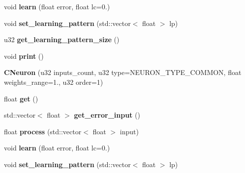 \begin{DoxyCompactItemize}
\item 
\hypertarget{classCNeuron_a64eb412ce09f2f59077281d86a085303}{void {\bfseries learn} (float error, float lc=0.)}\label{classCNeuron_a64eb412ce09f2f59077281d86a085303}

\item 
\hypertarget{classCNeuron_a0bcb7781406fa9a282eaafe4b154b5b6}{void {\bfseries set\-\_\-learning\-\_\-pattern} (std\-::vector$<$ float $>$ lp)}\label{classCNeuron_a0bcb7781406fa9a282eaafe4b154b5b6}

\item 
\hypertarget{classCNeuron_ad3cfde2fc3314e525345e8ec6595b1cb}{u32 {\bfseries get\-\_\-learning\-\_\-pattern\-\_\-size} ()}\label{classCNeuron_ad3cfde2fc3314e525345e8ec6595b1cb}

\item 
\hypertarget{classCNeuron_a37db8b58d3d3cd00c2cdc12b0a7466b3}{void {\bfseries print} ()}\label{classCNeuron_a37db8b58d3d3cd00c2cdc12b0a7466b3}

\item 
\hypertarget{classCNeuron_ae9f32d41d2bb7b9683a440e038f5b6f6}{{\bfseries C\-Neuron} (u32 inputs\-\_\-count, u32 type=N\-E\-U\-R\-O\-N\-\_\-\-T\-Y\-P\-E\-\_\-\-C\-O\-M\-M\-O\-N, float weights\-\_\-range=1., u32 order=1)}\label{classCNeuron_ae9f32d41d2bb7b9683a440e038f5b6f6}

\item 
\hypertarget{classCNeuron_af97048090878729c7d99dcb8363e61ff}{float {\bfseries get} ()}\label{classCNeuron_af97048090878729c7d99dcb8363e61ff}

\item 
\hypertarget{classCNeuron_a50f6d18278e8fa7cd4d189657b019989}{std\-::vector$<$ float $>$ {\bfseries get\-\_\-error\-\_\-input} ()}\label{classCNeuron_a50f6d18278e8fa7cd4d189657b019989}

\item 
\hypertarget{classCNeuron_a0b9c5ff02de4dae0f2bc98d81810d597}{float {\bfseries process} (std\-::vector$<$ float $>$ input)}\label{classCNeuron_a0b9c5ff02de4dae0f2bc98d81810d597}

\item 
\hypertarget{classCNeuron_a64eb412ce09f2f59077281d86a085303}{void {\bfseries learn} (float error, float lc=0.)}\label{classCNeuron_a64eb412ce09f2f59077281d86a085303}

\item 
\hypertarget{classCNeuron_a0bcb7781406fa9a282eaafe4b154b5b6}{void {\bfseries set\-\_\-learning\-\_\-pattern} (std\-::vector$<$ float $>$ lp)}\label{classCNeuron_a0bcb7781406fa9a282eaafe4b154b5b6}


\end{DoxyCompactItemize}
